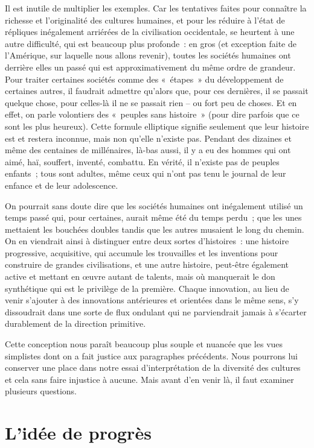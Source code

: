 \documentclass[french,twoside]{book} %
\begin{document}
Il est inutile de multiplier les exemples. Car les tentatives faites pour connaître la richesse et l’originalité des cultures humaines, et pour les réduire à l’état de répliques inégalement arriérées de la civilisation occidentale, se heurtent à une autre difficulté, qui est beaucoup plus profonde : en gros (et exception faite de l’Amérique, sur laquelle nous allons revenir), toutes les sociétés humaines ont derrière elles un passé qui est approximativement du même ordre de grandeur. Pour traiter certaines sociétés comme des « étapes » du développement de certaines autres, il faudrait admettre qu’alors que, pour ces dernières, il se passait quelque chose, pour celles-là il ne se passait rien – ou fort peu de choses. Et en effet, on parle volontiers des « peuples sans histoire » (pour dire parfois que ce sont les plus heureux). Cette formule elliptique signifie seulement que leur histoire est et restera inconnue, mais non qu’elle n’existe pas. Pendant des dizaines et même des centaines de millénaires, là-bas aussi, il y a eu des hommes qui ont aimé, haï, souffert, inventé, combattu. En vérité, il n’existe pas de peuples enfants ; tous sont adultes, même ceux qui n’ont pas tenu le journal de leur enfance et de leur adolescence.\par
On pourrait sans doute dire que les sociétés humaines ont inégalement utilisé un temps passé qui, pour certaines, aurait même été du temps perdu ; que les unes mettaient les bouchées doubles tandis que les autres musaient le long du chemin. On en viendrait ainsi à distinguer entre deux sortes d’histoires : une histoire progressive, acquisitive, qui accumule les trouvailles et les inventions pour construire de grandes civilisations, et une autre histoire, peut-être également active et mettant en œuvre autant de talents, mais où manquerait le don synthétique qui est le privilège de la première. Chaque innovation, au lieu de venir s’ajouter à des innovations antérieures et orientées dans le même sens, s’y dissoudrait dans une sorte de flux ondulant qui ne parviendrait jamais à s’écarter durablement de la direction primitive.\par
Cette conception nous paraît beaucoup plus souple et nuancée que les vues simplistes dont on a fait justice aux paragraphes précédents. Nous pourrons lui conserver une place dans notre essai d’interprétation de la diversité des cultures et cela sans faire injustice à aucune. Mais avant d’en venir là, il faut examiner plusieurs questions.

\section[{L’idée de progrès}]{L’idée de progrès}
\renewcommand{\leftmark}{L’idée de progrès}
\end{document}
